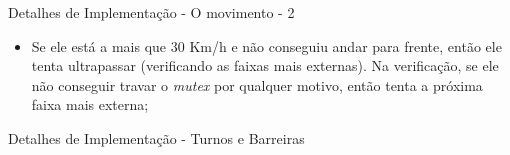 \documentclass[10pt]{beamer}
\begin{document}
    \begin{frame}{Detalhes de Implementação - O movimento - 2}
      \begin{itemize}
        \justifying
        \item Se ele está a mais que $30$ Km/h e não conseguiu andar para
          frente, então ele tenta ultrapassar (verificando as faixas mais
          externas). Na verificação, se ele não conseguir travar o
          \textit{mutex} por qualquer motivo, então tenta a próxima faixa mais
          externa;
      \end{itemize}
    \end{frame}

    \begin{frame}{Detalhes de Implementação - Turnos e Barreiras}
      \begin{itemize}
        \justifying
      \end{itemize}
    \end{frame}
\end{document}
